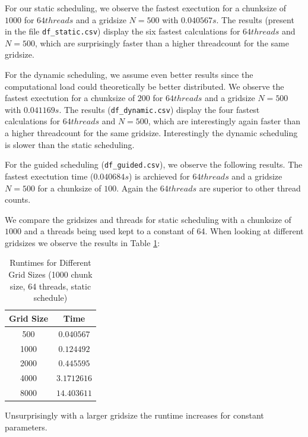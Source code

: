\documentclass[a4paper,10pt]{article}
\begin{document}
For our static scheduling, we observe the fastest exectution for a chunksize of $ 1000 $ for $64 threads$ and a gridsize $N=500$ with $0.040567 s$.
The results (present in the file \verb|df_static.csv|) display the six fastest calculations for $64 threads$ and $N=500$, which are surprisingly faster than a higher threadcount for the same gridsize.

For the dynamic scheduling, we assume even better results since the computational load could theoretically be better distributed. 
We observe the fastest exectution for a chunksize of $ 200 $ for $64 threads$ and a gridsize $N=500$ with $0.041169 s$.
The results (\verb|df_dynamic.csv|) display the four fastest calculations for $64 threads$ and $N=500$, which are interestingly again faster than a higher threadcount for the same gridsize.
Interestingly the dynamic scheduling is slower than the static scheduling.

For the guided scheduling (\verb|df_guided.csv|), we observe the following results. The fastest exectution time ($0.040684 s$) is archieved for $64 threads$ and a gridsize $N=500$ for a chunksize of $100$.
Again the $64 threads$ are superior to other thread counts.

We compare the gridsizes and threads for static scheduling with a chunksize of $1000$ and a threads being used kept to a constant of 64. When looking at different gridsizes we observe the results in Table \ref{table:ex5_grid_changes}:

\begin{table}[h!]
\centering
\begin{tabular}{|c|c|}
\hline
\textbf{Grid Size} & \textbf{Time} \\
\hline
500  & $0.040567$  \\
1000 & $0.124492$ \\
2000 & $0.445595$ \\
4000 & $3.1712616$ \\
8000 & $14.403611$ \\
\hline
\end{tabular}
\caption{Runtimes for Different Grid Sizes (1000 chunk size, 64 threads, static schedule)}
\label{table:ex5_grid_changes}
\end{table}

Unsurprisingly with a larger gridsize the runtime increases for constant parameters.
\end{document}
